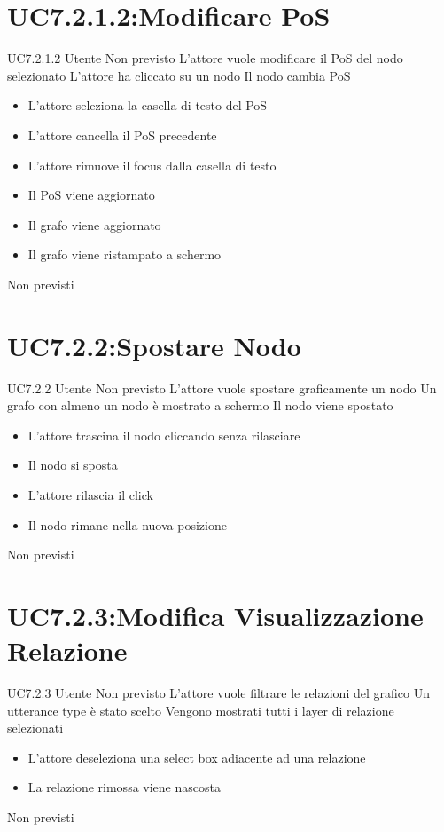 \documentclass[../AnalisideiRequisiti.tex]{subfiles}
\begin{document}
\section{UC7.2.1.2:Modificare PoS}
\UserCase
{UC7.2.1.2}
{Utente}
{Non previsto}
{L'attore vuole modificare il PoS del nodo selezionato}
{L'attore ha cliccato su un nodo }
{Il nodo cambia PoS}
{
	\begin{itemize}
		\item{} L'attore seleziona la casella di testo del PoS
		\item{} L'attore cancella il PoS precedente
		\item{} L'attore rimuove il focus dalla casella di testo
		\item{} Il PoS viene aggiornato
		\item{} Il grafo viene aggiornato 
		\item{} Il grafo viene ristampato a schermo 
	\end{itemize}
}
{Non previsti}

\section{UC7.2.2:Spostare Nodo}
\UserCase
{UC7.2.2}
{Utente}
{Non previsto}
{L'attore vuole spostare graficamente un nodo}
{Un grafo con almeno un nodo è mostrato a schermo}
{Il nodo viene spostato}
{
	\begin{itemize}
		\item{} L'attore trascina il nodo cliccando senza rilasciare
		\item{} Il nodo si sposta
		\item{} L'attore rilascia il click
		\item{} Il nodo rimane nella nuova posizione
	\end{itemize}
}
{Non previsti}

\section{UC7.2.3:Modifica Visualizzazione Relazione}
\UserCase
{UC7.2.3}
{Utente}
{Non previsto}
{L'attore vuole filtrare le relazioni del grafico}
{Un utterance type è stato scelto }
{Vengono mostrati tutti i layer di relazione selezionati}
{
	\begin{itemize}
		\item{} L'attore deseleziona una select box adiacente ad una relazione
		\item{} La relazione rimossa viene nascosta
	\end{itemize}
}
{Non previsti}
\end{document}
